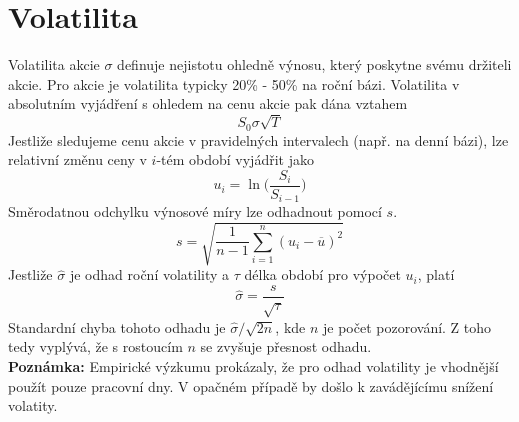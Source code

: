 \documentclass[a4paper]{book}
\begin{document}
\section{Volatilita}

Volatilita akcie $\sigma$ definuje nejistotu ohledně výnosu, který poskytne svému držiteli akcie. Pro akcie je volatilita typicky 20\% - 50\% na roční bázi. Volatilita v absolutním vyjádření s ohledem na cenu akcie pak dána vztahem
\begin{equation*}
S_0 \sigma \sqrt{T}
\end{equation*}
Jestliže sledujeme cenu akcie v pravidelných intervalech (např. na denní bázi), lze relativní změnu ceny v $i$-tém období vyjádřit jako
\begin{equation*}
u_i = \ln \bigg( \frac{S_i}{S_{i-1}} \bigg)
\end{equation*}
Směrodatnou odchylku výnosové míry lze odhadnout pomocí $s$.
\begin{equation*}
s=\sqrt{\frac{1}{n-1} \sum_{i=1}^n (u_i - \overline{u})^2}
\end{equation*}
Jestliže $\hat{\sigma}$ je odhad roční volatility a $\tau$ délka období pro výpočet $u_i$, platí
\begin{equation*}
\hat{\sigma}=\frac{s}{\sqrt{\tau}}
\end{equation*}
Standardní chyba tohoto odhadu je $\hat{\sigma} / \sqrt{2n}$, kde $n$ je počet pozorování. Z toho tedy vyplývá, že s rostoucím $n$ se zvyšuje přesnost odhadu.\\

\noindent \textbf{Poznámka:} Empirické výzkumu prokázaly, že pro odhad volatility je vhodnější použít pouze pracovní dny. V opačném případě by došlo k zavádějícímu snížení volatity.
\end{document}
